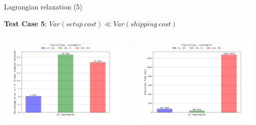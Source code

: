 \documentclass{beamer}
\begin{document}
	    \begin{frame}{Lagrangian relaxation (5)}
	    
        \textbf{Test Case 5}: $Var(setup \ cost) \ll Var(shipping \ cost)$
        
        
        \begin{columns}
	   \centering
        \includegraphics[width=6.5cm,height=4.2cm]{img/chart_error_lagrangian_4.png}
        
        \centering
        \includegraphics[width=6.5cm,height=4.2cm]{img/chart_time_lagrangian_4.png}
        \end{columns}
        
	    \end{frame}
	
\end{document}
